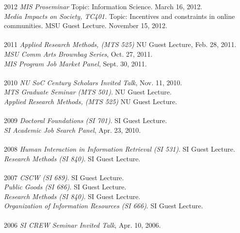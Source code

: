 \documentclass[9pt]{extarticle}
\begin{document}
\begin{tabbing}
2012 \hspace{0.3in}\=  \emph{MIS Proseminar} Topic: Information Science. March 16, 2012.\\
\> \emph{Media Impacts on Society, TC401.} Topic: Incentives and constraints in online \\
\> \hspace{0.5cm} communities. MSU Guest Lecture. November 15, 2012. \\\\

2011 \hspace{0.3in}\= \emph{Applied Research Methods, (MTS 525)} NU Guest Lecture, Feb. 28, 2011. \\
\> \emph{MSU Comm Arts Brownbag Series}, Oct. 27, 2011. \\
\> \emph{MIS Program Job Market Panel}, Sept. 30, 2011. \\\\

2010 \hspace{0.3in}\= \emph{NU SoC Century Scholars Invited Talk}, Nov. 11, 2010. \\
\> \emph{MTS Graduate Seminar (MTS 501)}. NU Guest Lecture. \\
\> \emph{Applied Research Methods, (MTS 525)} NU Guest Lecture. \\\\

2009 \hspace{0.3in}\= \emph{Doctoral Foundations (SI 701)}. SI Guest Lecture. \\
\> \emph{SI Academic Job Search Panel}, Apr. 23, 2010. \\\\

2008 \hspace{0.3in}\= \emph{Human Interaction in Information Retrieval (SI 531)}. SI Guest Lecture. \\
\> \emph{Research Methods (SI 840)}. SI Guest Lecture. \\\\

2007 \hspace{0.3in}\= \emph{CSCW (SI 689)}. SI Guest Lecture. \\
\> \emph{Public Goods (SI 686)}. SI Guest Lecture. \\
\> \emph{Research Methods (SI 840)}. SI Guest Lecture. \\
\> \emph{Organization of Information Resources (SI 666)}. SI Guest Lecture. \\\\

2006 \hspace{0.3in}\= \emph{SI CREW Seminar Invited Talk}, Apr. 10, 2006. \\
\end{tabbing}
\end{document}
